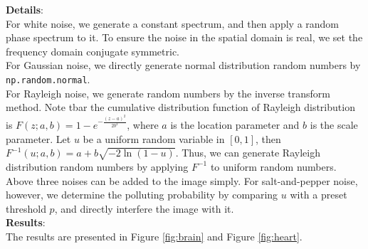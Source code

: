 \documentclass[UTF8]{ctexart}
\begin{document}
\textbf{Details}:\\
For white noise, we generate a constant spectrum, and then apply a random phase spectrum to it. To ensure the noise in the spatial domain is real, we set the frequency domain conjugate symmetric.\\
For Gaussian noise, we directly generate normal distribution random numbers by \texttt{np.random.normal}.\\
For Rayleigh noise, we generate random numbers by the inverse transform method. Note tbar the cumulative distribution function of Rayleigh distribution is
$F(z;a,b)=1-e^{-\frac{(z-a)^2}{2b^2}}$, where $a$ is the location parameter and $b$ is the scale parameter. Let $u$ be a uniform random variable in $[0,1]$, then $F^{-1}(u;a,b)=a+b\sqrt{-2\ln(1-u)}$.
Thus, we can generate Rayleigh distribution random numbers by applying $F^{-1}$ to uniform random numbers.\\
Above three noises can be added to the image simply. For salt-and-pepper noise, however, we determine the polluting probability by comparing $u$ with a preset threshold $p$, and directly interfere the image with it.\\
\textbf{Results}:\\
The results are presented in Figure \ref{fig:brain} and Figure \ref{fig:heart}.\\
\end{document}
